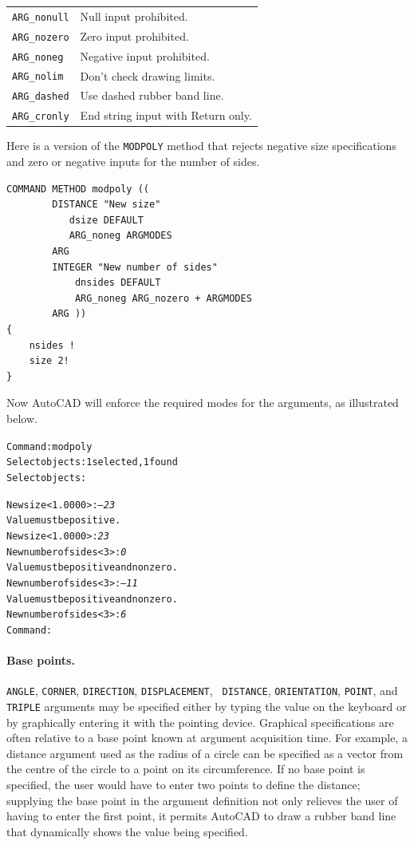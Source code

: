 \documentclass{article}
\begin{document}
\begin{tabular}{ll}
\verb+ARG_nonull+ & Null input prohibited. \\
\verb+ARG_nozero+ & Zero input prohibited. \\
\verb+ARG_noneg+  & Negative input prohibited. \\
\verb+ARG_nolim+  & Don't check drawing limits. \\
\verb+ARG_dashed+ & Use dashed rubber band line.\\
\verb+ARG_cronly+ & End string input with Return only.\\
\end{tabular}

Here is a version of the {\tt MODPOLY} method that rejects negative
size specifications and zero or negative inputs for the number of
sides.

\begin{verbatim}
COMMAND METHOD modpoly ((
        DISTANCE "New size"
           dsize DEFAULT
           ARG_noneg ARGMODES
        ARG
        INTEGER "New number of sides"
            dnsides DEFAULT
            ARG_noneg ARG_nozero + ARGMODES
        ARG ))
{
    nsides !
    size 2!
}
\end{verbatim}

Now AutoCAD will enforce the required modes for the arguments, as
illustrated below.

\begin{alltt}
Command: {\tt modpoly}
Select objects: 1 selected, 1 found
Select objects:

New size <1.0000>: {\em --23}
Value must be positive.
New size <1.0000>: {\em 23}
New number of sides <3>: {\em 0}
Value must be positive and nonzero.
New number of sides <3>: {\em --11}
Value must be positive and nonzero.
New number of sides <3>: {\em 6}
Command:
\end{alltt}

\paragraph{Base points.}
{\tt ANGLE}, {\tt CORNER}, {\tt DIRECTION}, {\tt DISPLACEMENT}, {\tt
DISTANCE}, {\tt ORIENTATION}, {\tt POINT}, and {\tt TRIPLE} arguments
may be specified either by typing the value on the keyboard or by
graphically entering it with the pointing device.  Graphical
specifications are often relative to a base point known at argument
acquisition time.  For example, a distance argument used as the radius
of a circle can be specified as a vector from the centre of
the circle to a point on its circumference.  If no base point is
specified, the user would have to enter two points to define the
distance; supplying the base point in the argument definition not only
relieves the user of having to enter the first point, it permits
AutoCAD to draw a rubber band line that dynamically shows the value being
specified.
\end{document}
